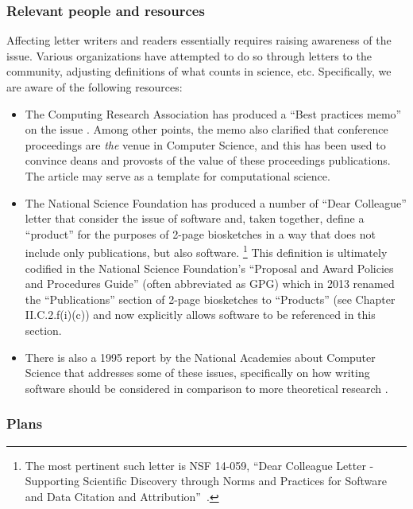 \subsubsection{Relevant people and resources}

Affecting letter writers and readers essentially requires raising
awareness of the issue. Various organizations have attempted to do so
through letters to the community, adjusting definitions of what counts
in science, etc. Specifically, we are aware of the following
resources:

\begin{itemize}
\item The Computing Research Association has produced a ``Best
  practices memo'' on the issue \cite{PSU99}. Among other points,
  the memo also clarified that conference proceedings are
  \textit{the} venue in Computer Science, and this has been used to
  convince deans and provosts of the value of these proceedings
  publications. The article may serve as a template for computational
  science.
\item The National Science Foundation has produced a number of ``Dear
  Colleague'' letter that consider the issue of software and, taken
  together, define a ``product'' for the purposes of
  2-page biosketches in a way that does not include only publications, but also
  software.%
  \footnote{The most pertinent such letter is NSF
      14-059, ``Dear Colleague Letter - Supporting Scientific
      Discovery through Norms and Practices for Software and Data
      Citation and Attribution''~\cite{nsf-dcl-citation}.}
  This definition is ultimately codified in the National Science
  Foundation's ``Proposal and Award Policies and Procedures Guide''
  (often abbreviated as GPG) which in 2013 renamed the
  ``Publications'' section of 2-page biosketches to ``Products'' (see
  Chapter II.C.2.f(i)(c)) and now explicitly allows software to be
  referenced in this section.
\item There is also a 1995 report by the National Academies about
  Computer Science that addresses some of these issues, specifically
  on how writing software should be considered in comparison to more
  theoretical research \cite{NRC-careers-94}. 
\end{itemize}



\subsubsection{Plans}

